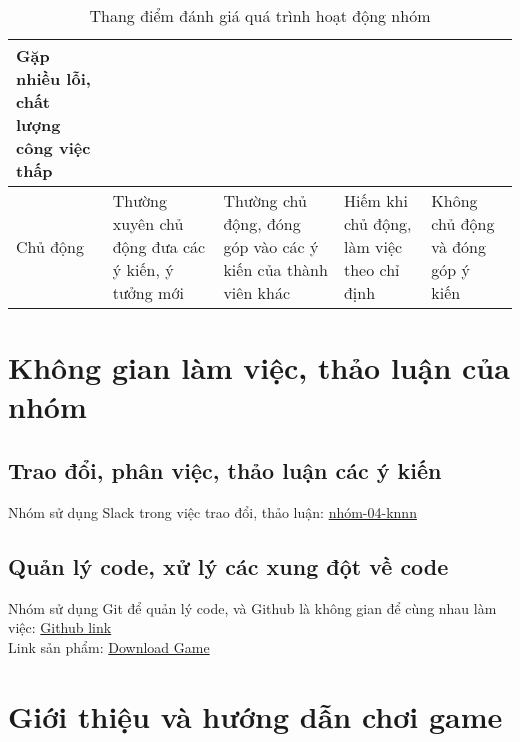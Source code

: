 \documentclass[12pt]{report}
\begin{document}
\begin{table}[H]
{\begin{tabularx}{\textwidth}{|p{60pt}|X|X|X|X|}
            Gặp nhiều lỗi, chất lượng công việc thấp                               \\
            \hline
            Chủ động                                                             &
            Thường xuyên chủ động đưa các ý kiến, ý tưởng mới                    &
            Thường chủ động, đóng góp vào các ý kiến của thành viên khác         &
            Hiếm khi chủ động, làm việc theo chỉ định                            &
            Không chủ động và đóng góp ý kiến                                      \\
            \hline
        \end{tabularx}
    }
    \caption{Thang điểm đánh giá quá trình hoạt động nhóm}
    \label{tab:teamwork_rubric}
\end{table}

\chapter{Không gian làm việc, thảo luận của nhóm}
\label{sec:work_space}

\section{Trao đổi, phân việc, thảo luận các ý kiến}
Nhóm sử dụng Slack trong việc trao đổi, thảo luận: \href{https://ss004e11cn1.slack.com/archives/C07T94K918U}{nhóm-04-knnn}
\section{Quản lý code, xử lý các xung đột về code}
Nhóm sử dụng Git để quản lý code, và Github là không gian để cùng nhau làm việc: \href{https://github.com/ThinhNgo96/snake_game}{Github link} \\
Link sản phẩm: \href{https://github.com/ThinhNgo96/snake_game/releases}{Download Game}

\chapter{Giới thiệu và hướng dẫn chơi game}
\label{sec:game_tutorial}
\end{document}

